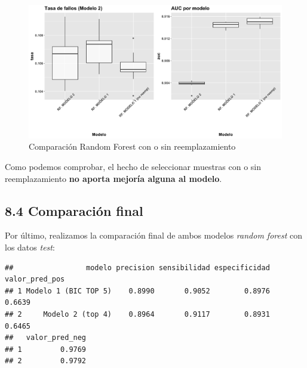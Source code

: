 \documentclass[
]{article}
\begin{document}
\begin{figure}[h!]

{\centering \includegraphics[width=0.99\linewidth,height=0.99\textheight,]{./charts/comparativas/03_rf_con_sin_reemp} 

}

\caption{Comparación Random Forest con o sin reemplazamiento}\label{fig:unnamed-chunk-100}
\end{figure}

Como podemos comprobar, el hecho de seleccionar muestras con o sin
reemplazamiento \textbf{no aporta mejoría alguna al modelo}.

\hypertarget{comparaciuxf3n-final-2}{%
\subsection{8.4 Comparación final}\label{comparaciuxf3n-final-2}}

Por último, realizamos la comparación final de ambos modelos
\emph{random forest} con los datos \emph{test}:

\begin{verbatim}
##                 modelo precision sensibilidad especificidad valor_pred_pos
## 1 Modelo 1 (BIC TOP 5)    0.8990       0.9052        0.8976         0.6639
## 2     Modelo 2 (top 4)    0.8964       0.9117        0.8931         0.6465
##   valor_pred_neg
## 1         0.9769
## 2         0.9792
\end{verbatim}
\end{document}
